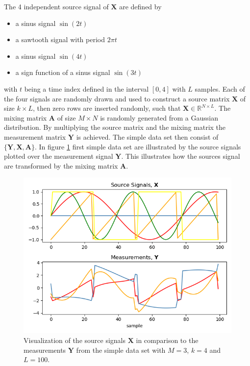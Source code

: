 The 4 independent source signal of $\textbf{X}$ are defined by 
\begin{itemize}
\item[1.] a sinus signal $\sin(2t)$
\item[2.] a sawtooth signal with period $2 \pi t$
\item[3.] a sinus signal $\sin(4t)$
\item[4.] a sign function of a sinus signal $\sin(3t)$
\end{itemize}
with $t$ being a time index defined in the interval $[0,4]$ with $L$ samples. Each of the four signals are randomly drawn and used to construct a source matrix $\mathbf{X}$ of size $k \times L$, then zero rows are inserted randomly, such that $\textbf{X}\in \mathbb{R}^{N\times L}$. 
The mixing matrix $\mathbf{A}$ of size $M \times N$ is randomly generated from a Gaussian distribution. 
By multiplying the source matrix and the mixing matrix the measurement matrix $\mathbf{Y}$ is achieved.
The simple data set then consist of $\{ \mathbf{Y}, \mathbf{X}, \mathbf{A} \}$.
In figure \ref{fig:simple} first simple data set are illustrated by the source signals plotted over the measurement signal $\mathbf{Y}$. This illustrates how the sources signal are transformed by the mixing matrix $\textbf{A}$.
\begin{figure}[H]
\centering
\includegraphics[scale=0.5]{figures/ch_6/simple_data.png}
\caption{Visualization of the source signals $\textbf{X}$ in comparison to the measurements $\mathbf{Y}$ from the simple data set with $M = 3$, $k=4$ and $L=100$.}
\label{fig:simple}
\end{figure}
\noindent

